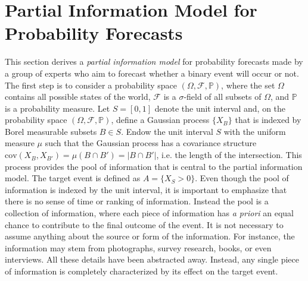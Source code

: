\documentclass[11pt]{article}
\renewcommand{\P}{\mathbb{P}}
\theoremstyle{definition}
\theoremstyle{definition}
\begin{document}







\section{Partial Information Model for Probability Forecasts}
\label{Model}
This section derives a \textit{partial information model} for probability forecasts made by a group of experts who aim to forecast whether a binary event will occur or not. The first step is to consider a probability space  $(\Omega, \mathcal{F}, \P)$, where the set $\Omega$ contains all possible states of the world,  $\mathcal{F}$ is a $\sigma$-field of all subsets of $\Omega$, and $\P$ is a probability measure. Let $S = [0,1]$ denote the unit interval and, on the probability space $(\Omega, \mathcal{F}, \P)$, define a Gaussian process $\{ X_B \}$ that is indexed by Borel measurable subsets $B \in S$. Endow the unit interval $S$ with the uniform measure $\mu$ such that the Gaussian process has a covariance structure $\text{cov}(X_B, X_{B'}) = \mu(B \cap B') = |B \cap B'|$, i.e. the length of the intersection. This process provides the pool of information that is central to the partial information model. The target event is defined as $A = \{ X_{S} > 0\}$. Even though the pool of information is indexed by the unit interval, it is important to emphasize that there is no sense of time or ranking of information. Instead the pool is a collection of information, where each piece of information has \textit{a priori} an equal chance to contribute to the final outcome of the event. It is not necessary to assume anything about the source or form of the information. For instance, the information may stem from photographs, survey research, books, or even interviews. All these details have been abstracted away. Instead, any single piece of information is completely characterized by its effect on the target event. 
\end{document}
